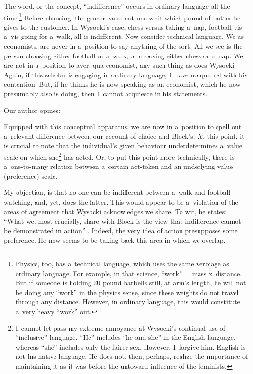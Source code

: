 The word, or the concept, ``indifference'' occurs in ordinary language all the time.\footnote{Physics, too, has a~technical language, which uses the same verbiage as ordinary language. For example, in that science, ``work'' = mass x~distance. But if someone is holding 20 pound barbells still, at arm's length, he will not be doing any ``work'' in the physics sense, since these weights do not travel through any distance. However, in ordinary language, this would constitute a~very heavy ``work'' out. } Before choosing, the grocer cares not one whit which pound of butter he gives to the customer. In Wysocki's case, chess versus taking a~nap, football vis a~vis going for a~walk, all is indifferent. Now consider technical language. We as economists, are never in a~position to say anything of the sort. All we see is the person choosing either football or a~walk, or choosing either chess or a~nap. We are not in a~position to aver, qua economist, any such thing as does Wysocki. Again, if this scholar is engaging in ordinary language, I~have no quarrel with his contention. But, if he thinks he is now speaking as an economist, which he now presumably also is doing, then I~cannot acquiesce in his statements.



Our author opines:



Equipped with this conceptual apparatus, we are now in a~position to spell out a~relevant difference between our account of choice and Block's. At this point, it is crucial to note that the individual's given behaviour underdetermines a~value scale on which she\footnote{I~cannot let pass my extreme annoyance at Wysocki's continual use of ``inclusive'' language. ``He'' includes ``he and she'' in the English language, whereas ``she'' includes only the fairer sex. However, I~forgive him. English is not his native language. He does not, then, perhaps, realize the importance of maintaining it as it was before the untoward influence of the feminists.} has acted. Or, to put this point more technically, there is a~one-to-many relation between a~certain act-token and an underlying value (preference) scale.



My objection, is that no one can be indifferent between a~walk and football watching, and, yet, does the latter. This would appear to be a~violation of the areas of agreement that Wysocki acknowledges we share. To wit, he states: ``What we, most crucially, share with Block is the view that indifference cannot be demonstrated in action'' 
\parencites[see e.g.,][]{block_rejoinder_2009}[][]{block_rejoinder_2009-1}[][]{rothbard_toward_2011}. %
 Indeed, the very idea of action presupposes some preference. He now seems to be taking back this area in which we overlap.



